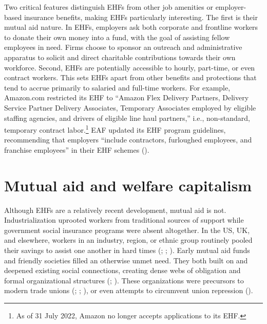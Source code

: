 \documentclass[
  11pt,
  oneside]{article}
\begin{document}
Two critical features distinguish EHFs from other job amenities or employer-based insurance benefits, making EHFs particularly interesting. The first is their mutual aid nature. In EHFs, employers ask both corporate and frontline workers to donate their own money into a fund, with the goal of assisting fellow employees in need. Firms choose to sponsor an outreach and administrative apparatus to solicit and direct charitable contributions towards their own workforce. Second, EHFs are potentially accessible to hourly, part-time, or even contract workers. This sets EHFs apart from other benefits and protections that tend to accrue primarily to salaried and full-time workers. For example, Amazon.com restricted its EHF to ``Amazon Flex Delivery Partners, Delivery Service Partner Delivery Associates, Temporary Associates employed by eligible staffing agencies, and drivers of eligible line haul partners,'' i.e., non-standard, temporary contract labor.\footnote{As of 31 July 2022, Amazon no longer accepts applications to its EHF.} EAF updated its EHF program guidelines, recommending that employers ``include contractors, furloughed employees, and franchise employees'' in their EHF schemes ().

\section{Mutual aid and welfare capitalism}\label{mutual-aid-and-welfare-capitalism}

Although EHFs are a relatively recent development, mutual aid is not. Industrialization uprooted workers from traditional sources of support while government social insurance programs were absent altogether. In the US, UK, and elsewhere, workers in an industry, region, or ethnic group routinely pooled their savings to assist one another in hard times (; ; ). Early mutual aid funds and friendly societies filled an otherwise unmet need. They both built on and deepened existing social connections, creating dense webs of obligation and formal organizational structures (; ). These organizations were precursors to modern trade unions (; ; ), or even attempts to circumvent union repression ().
\end{document}
